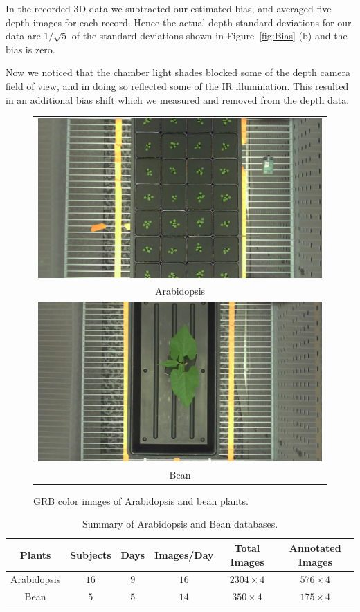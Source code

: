 In the recorded $3$D data we subtracted our estimated bias, and averaged five depth images for each record.  Hence the actual depth standard deviations for our data are $1/\sqrt{5}$ of the standard deviations shown in Figure~\ref{fig:Bias} (b) and the bias is zero.

Now we noticed that the chamber light shades blocked some of the depth camera field of view, and in doing so reflected some of the IR illumination.  This resulted in an additional bias shift which we measured and removed from the depth data. %

\begin{figure}
\begin{centering}
\begin{tabular}{c }
\includegraphics[width=.47\textwidth]{Figures/rawImages/a.png}\\
Arabidopsis \\
\includegraphics[width=.47\textwidth]{Figures/rawImages/b.png}\\
   Bean \\
\end{tabular}
\caption{GRB color images of Arabidopsis and bean plants. }
\label{fig:rawIm}
\end{centering}
\end{figure}


\begin{table}[t!]
\begin{center}
\caption{Summary of Arabidopsis and Bean databases.}
\label{tab:stat}
\begin{tabular}{c|c|c|c|c|c}
      \hline
      Plants     & Subjects & Days & Images/Day & Total Images & Annotated Images \\
      \hline
      Arabidopsis &  $16$      &  $9$   &     $16$     &     $2304\times 4$     &       $576\times 4$     \\
      \hline
      Bean        &   $5$      &  $5$   &     $14$     &     $350\times 4$       &       $175\times 4$  \\
      \hline
\end{tabular}
\end{center}
\end{table}



